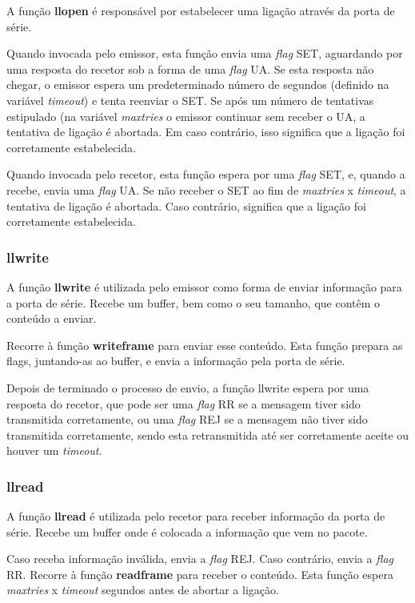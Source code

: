 \documentclass[11pt,a4paper,reqno]{article}
\numberwithin{equation}{section}
\begin{document}
A função \textbf{llopen} é responsável por estabelecer uma ligação através da porta de série.

Quando invocada pelo emissor, esta função envia uma \textit{flag} SET, aguardando por uma resposta do recetor sob a forma de uma \textit{flag} UA. Se esta resposta não chegar, o emissor espera um predeterminado número de segundos (definido na variável \textit{timeout}) e tenta reenviar o SET. Se após um número de tentativas estipulado (na variável \textit{max\textunderscore tries} o emissor continuar sem receber o UA, a tentativa de ligação é abortada. Em caso contrário, isso significa que a ligação foi corretamente estabelecida.

Quando invocada pelo recetor, esta função espera por uma \textit{flag} SET, e, quando a recebe, envia uma \textit{flag} UA. Se não receber o SET ao fim de \textit{max\textunderscore tries} x \textit{timeout}, a tentativa de ligação é abortada. Caso contrário, significa que a ligação foi corretamente estabelecida.

\subsubsection{llwrite}

A função \textbf{llwrite} é utilizada pelo emissor como forma de enviar informação para a porta de série. Recebe um buffer, bem como o seu tamanho, que contêm o conteúdo a enviar.

Recorre à função \textbf{write\textunderscore frame} para enviar esse conteúdo. Esta função prepara as flags, juntando-as ao buffer, e envia a informação pela porta de série.

Depois de terminado o processo de envio, a função llwrite espera por uma resposta do recetor, que pode ser uma \textit{flag} RR se a mensagem tiver sido transmitida corretamente, ou uma \textit{flag} REJ se a mensagem não tiver sido transmitida corretamente, sendo esta retransmitida até ser corretamente aceite ou houver um \textit{timeout}.

\subsubsection{llread}

A função \textbf{llread} é utilizada pelo recetor para receber informação da porta de série. Recebe um buffer onde é colocada a informação que vem no pacote.

Caso receba informação inválida, envia a \textit{flag} REJ. Caso contrário, envia a \textit{flag} RR. Recorre à função \textbf{read\textunderscore frame} para receber o conteúdo. Esta função espera \textit{max\textunderscore tries} x \textit{timeout} segundos antes de abortar a ligação.
\end{document}
